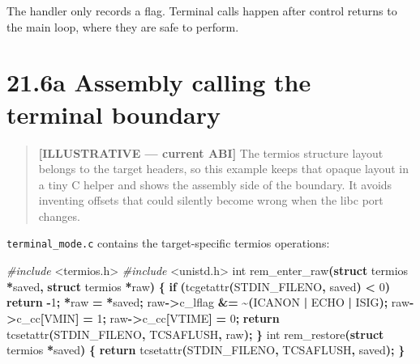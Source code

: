 \documentclass[
  oneside,
  openany]{book}
\newenvironment{Shaded}{\begin{snugshade}}{\end{snugshade}}
\newcommand{\ControlFlowTok}[1]{\textcolor[rgb]{0.13,0.29,0.53}{\textbf{#1}}}
\newcommand{\DataTypeTok}[1]{\textcolor[rgb]{0.13,0.29,0.53}{#1}}
\newcommand{\DecValTok}[1]{\textcolor[rgb]{0.00,0.00,0.81}{#1}}
\newcommand{\ImportTok}[1]{#1}
\newcommand{\KeywordTok}[1]{\textcolor[rgb]{0.13,0.29,0.53}{\textbf{#1}}}
\newcommand{\NormalTok}[1]{#1}
\newcommand{\OperatorTok}[1]{\textcolor[rgb]{0.81,0.36,0.00}{\textbf{#1}}}
\newcommand{\PreprocessorTok}[1]{\textcolor[rgb]{0.56,0.35,0.01}{\textit{#1}}}
\begin{document}
The handler only records a flag. Terminal calls happen after control
returns to the main loop, where they are safe to perform.

\hypertarget{a-assembly-calling-the-terminal-boundary}{%
\section{21.6a Assembly calling the terminal
boundary}\label{a-assembly-calling-the-terminal-boundary}}

\begin{quote}
\textbf{{[}ILLUSTRATIVE --- current ABI{]}} The termios structure layout
belongs to the target headers, so this example keeps that opaque layout
in a tiny C helper and shows the assembly side of the boundary. It
avoids inventing offsets that could silently become wrong when the libc
port changes.
\end{quote}

\texttt{terminal\_mode.c} contains the target-specific termios
operations:

\begin{Shaded}
\begin{Highlighting}[]
\PreprocessorTok{\#include }\ImportTok{\textless{}termios.h\textgreater{}}
\PreprocessorTok{\#include }\ImportTok{\textless{}unistd.h\textgreater{}}
\DataTypeTok{int}\NormalTok{ rem\_enter\_raw}\OperatorTok{(}\KeywordTok{struct}\NormalTok{ termios }\OperatorTok{*}\NormalTok{saved}\OperatorTok{,} \KeywordTok{struct}\NormalTok{ termios }\OperatorTok{*}\NormalTok{raw}\OperatorTok{)} \OperatorTok{\{}
    \ControlFlowTok{if} \OperatorTok{(}\NormalTok{tcgetattr}\OperatorTok{(}\NormalTok{STDIN\_FILENO}\OperatorTok{,}\NormalTok{ saved}\OperatorTok{)} \OperatorTok{\textless{}} \DecValTok{0}\OperatorTok{)} \ControlFlowTok{return} \OperatorTok{{-}}\DecValTok{1}\OperatorTok{;}
    \OperatorTok{*}\NormalTok{raw }\OperatorTok{=} \OperatorTok{*}\NormalTok{saved}\OperatorTok{;}
\NormalTok{    raw}\OperatorTok{{-}\textgreater{}}\NormalTok{c\_lflag }\OperatorTok{\&=} \OperatorTok{\textasciitilde{}(}\NormalTok{ICANON }\OperatorTok{|}\NormalTok{ ECHO }\OperatorTok{|}\NormalTok{ ISIG}\OperatorTok{);}
\NormalTok{    raw}\OperatorTok{{-}\textgreater{}}\NormalTok{c\_cc}\OperatorTok{[}\NormalTok{VMIN}\OperatorTok{]} \OperatorTok{=} \DecValTok{1}\OperatorTok{;}\NormalTok{ raw}\OperatorTok{{-}\textgreater{}}\NormalTok{c\_cc}\OperatorTok{[}\NormalTok{VTIME}\OperatorTok{]} \OperatorTok{=} \DecValTok{0}\OperatorTok{;}
    \ControlFlowTok{return}\NormalTok{ tcsetattr}\OperatorTok{(}\NormalTok{STDIN\_FILENO}\OperatorTok{,}\NormalTok{ TCSAFLUSH}\OperatorTok{,}\NormalTok{ raw}\OperatorTok{);}
\OperatorTok{\}}
\DataTypeTok{int}\NormalTok{ rem\_restore}\OperatorTok{(}\KeywordTok{struct}\NormalTok{ termios }\OperatorTok{*}\NormalTok{saved}\OperatorTok{)} \OperatorTok{\{}
    \ControlFlowTok{return}\NormalTok{ tcsetattr}\OperatorTok{(}\NormalTok{STDIN\_FILENO}\OperatorTok{,}\NormalTok{ TCSAFLUSH}\OperatorTok{,}\NormalTok{ saved}\OperatorTok{);}
\OperatorTok{\}}
\end{Highlighting}
\end{Shaded}
\end{document}
